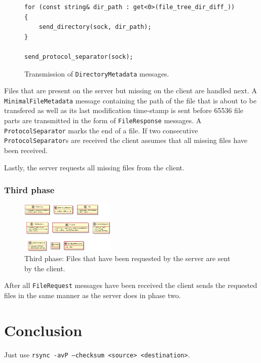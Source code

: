 \documentclass[a4paper]{article}
\begin{document}
\begin{figure}[H]
\begin{verbatim}
for (const string& dir_path : get<0>(file_tree_dir_diff_)) {
	send_directory(sock, dir_path);
}

send_protocol_separator(sock);
\end{verbatim}
\caption{Transmission of \texttt{DirectoryMetadata} messages.}
\end{figure}

Files that are present on the server but missing on the client are handled next. A \texttt{MinimalFileMetadata} message containing the path of the file that is about to be transfered as well as its last modification time-stamp is sent before \SI{65536}{\byte} file parts are transmitted in the form of \texttt{FileResponse} messages. A \texttt{ProtocolSeparator} marks the end of a file. If two consecutive \texttt{ProtocolSeparator}s are received the client assumes that all missing files have been received.

Lastly, the server requests all missing files from the client. 


\subsubsection{Third phase}
\begin{figure}[H]
\centering
\includegraphics[width=4.5cm]{third_stage}
\caption{Third phase: Files that have been requested by the server are sent by the client.}
\end{figure}

After all \texttt{FileRequest} messages have been received the client sends the requested files in the same manner as the server does in phase two.

\section{Conclusion}
Just use \texttt{rsync -avP --checksum <source> <destination>}.
\end{document}
